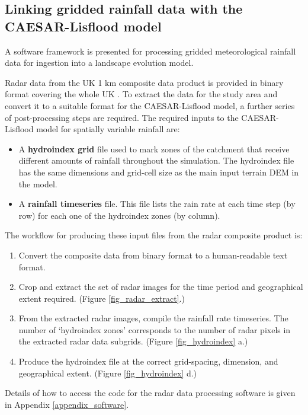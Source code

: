\subsection{Linking gridded rainfall data with the CAESAR-Lisflood model}
A software framework is presented for processing gridded meteorological rainfall data for ingestion into a landscape evolution model.

Radar data from the UK 1 km composite data product is provided in binary format covering the whole UK \citep{metoffice2003nimrod}. To extract the data for the study area and convert it to a suitable format for the CAESAR-Lisflood model, a further series of post-processing steps are required. The required inputs to the CAESAR-Lisflood model for spatially variable rainfall are:

\begin{itemize}
\item A \textbf{hydroindex grid} file used to mark zones of the catchment that receive different amounts of rainfall throughout the simulation. The hydroindex file has the same dimensions and grid-cell size as the main input terrain DEM in the model.
\item A \textbf{rainfall timeseries} file. This file lists the rain rate at each time step (by row) for each one of the hydroindex zones (by column).
\end{itemize}

The workflow for producing these input files from the radar composite product is:
\begin{enumerate}
\item Convert the composite data from binary format to a human-readable text format.
\item Crop and extract the set of radar images for the time period and geographical extent required. (Figure \ref{fig_radar_extract}.)
\item From the extracted radar images, compile the rainfall rate timeseries. The number of `hydroindex zones' corresponds to the number of radar pixels in the extracted radar data subgrids. (Figure \ref{fig_hydroindex} a.)
\item Produce the hydroindex file at the correct grid-spacing, dimension, and geographical extent. (Figure \ref{fig_hydroindex} d.)
\end{enumerate}

Details of how to access the code for the radar data processing software is given in Appendix \ref{appendix_software}.


